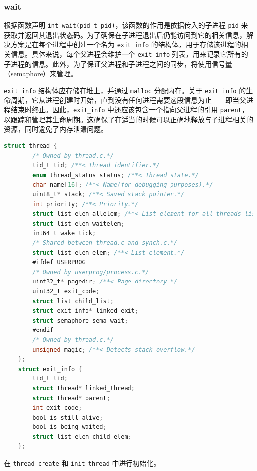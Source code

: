 \documentclass{article}
\begin{document}
\subsubsection{wait}

根据函数声明 \texttt{int wait(pid\_t pid)}，该函数的作用是依据传入的子进程 \texttt{pid} 来获取并返回其退出状态码。为了确保在子进程退出后仍能访问到它的相关信息，解决方案是在每个进程中创建一个名为 \texttt{exit\_info} 的结构体，用于存储该进程的相关信息。具体来说，每个父进程会维护一个 \texttt{exit\_info} 列表，用来记录它所有的子进程的信息。此外，为了保证父进程和子进程之间的同步，将使用信号量（semaphore）来管理。

\texttt{exit\_info} 结构体应存储在堆上，并通过 \texttt{malloc} 分配内存。关于 \texttt{exit\_info} 的生命周期，它从进程创建时开始，直到没有任何进程需要这段信息为止——即当父进程结束时终止。因此，\texttt{exit\_info} 中还应该包含一个指向父进程的引用 \texttt{parent}，以跟踪和管理其生命周期。这确保了在适当的时候可以正确地释放与子进程相关的资源，同时避免了内存泄漏问题。

\begin{lstlisting}[language=C]
	struct thread { 
		/* Owned by thread.c.*/
		tid_t tid; /**< Thread identifier.*/
		enum thread_status status; /**< Thread state.*/
		char name[16]; /**< Name(for debugging purposes).*/
		uint8_t* stack; /**< Saved stack pointer.*/
		int priority; /**< Priority.*/
		struct list_elem allelem; /**< List element for all threads list.*/
		struct list_elem waitelem; 
		int64_t wake_tick;
		/* Shared between thread.c and synch.c.*/
		struct list_elem elem; /**< List element.*/
		#ifdef USERPROG 
		/* Owned by userprog/process.c.*/
		uint32_t* pagedir; /**< Page directory.*/
		uint32_t exit_code;
		struct list child_list; 
		struct exit_info* linked_exit; 
		struct semaphore sema_wait;
		#endif
		/* Owned by thread.c.*/
		unsigned magic; /**< Detects stack overflow.*/
	};
	struct exit_info { 
		tid_t tid; 
		struct thread* linked_thread; 
		struct thread* parent; 
		int exit_code; 
		bool is_still_alive; 
		bool is_being_waited;
		struct list_elem child_elem; 
	};
\end{lstlisting}

在 \texttt{thread\_create} 和 \texttt{init\_thread} 中进行初始化。
\end{document}

